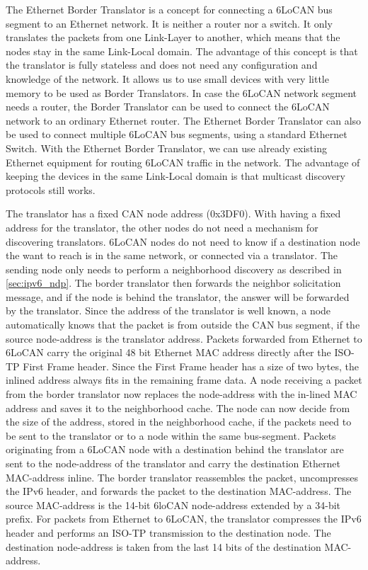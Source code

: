 The Ethernet Border Translator is a concept for connecting a 6LoCAN bus segment to an Ethernet network.
It is neither a router nor a switch.
It only translates the packets from one Link-Layer to another, which means that the nodes stay in the same Link-Local domain.
The advantage of this concept is that the translator is fully stateless and does not need any configuration and knowledge of the network.
It allows us to use small devices with very little memory to be used as Border Translators.
In case the 6LoCAN network segment needs a router, the Border Translator can be used to connect the 6LoCAN network to an ordinary Ethernet router.
The Ethernet Border Translator can also be used to connect multiple 6LoCAN bus segments, using a standard Ethernet Switch.
With the Ethernet Border Translator, we can use already existing Ethernet equipment for routing 6LoCAN traffic in the network.
The advantage of keeping the devices in the same Link-Local domain is that multicast discovery protocols still works.

The translator has a fixed CAN node address (0x3DF0).
With having a fixed address for the translator, the other nodes do not need a mechanism for discovering translators.
6LoCAN nodes do not need to know if a destination node the want to reach is in the same network, or connected via a translator.
The sending node only needs to perform a neighborhood discovery as described in \autoref{sec:ipv6_ndp}.
The border translator then forwards the neighbor solicitation message, and if the node is behind the translator,
the answer will be forwarded by the translator.
Since the address of the translator is well known, a node automatically knows that the packet is from outside the CAN bus segment,
if the source node-address is the translator address.
Packets forwarded from Ethernet to 6LoCAN carry the original 48 bit Ethernet MAC address directly after the ISO-TP First Frame header.
Since the First Frame header has a size of two bytes, the inlined address always fits in the remaining frame data.
A node receiving a packet from the border translator now replaces the node-address with the in-lined MAC address and saves it to the neighborhood cache.
The node can now decide from the size of the address, stored in the neighborhood cache,
if the packets need to be sent to the translator or to a node within the same bus-segment.
Packets originating from a 6LoCAN node with a destination behind the translator are sent to the node-address of the translator
and carry the destination Ethernet MAC-address inline.
The border translator reassembles the packet, uncompresses the IPv6 header, and forwards the packet to the destination MAC-address.
The source MAC-address is the 14-bit 6loCAN node-address extended by a 34-bit prefix.
For packets from Ethernet to 6LoCAN, the translator compresses the IPv6 header and performs an ISO-TP transmission to the destination node.
The destination node-address is taken from the last 14 bits of the destination MAC-address.

